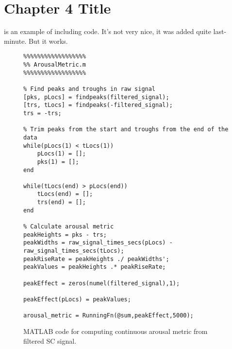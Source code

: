 
\chapter{Chapter 4 Title}

 is an example of including code. It's not very nice, it was added quite last-minute. But it works.

\begin{figure}[h]
	\centering
	
\begin{minipage}{0.8\textwidth}\smaller\begin{verbatim}
%%%%%%%%%%%%%%%%%%
%% ArousalMetric.m
%%%%%%%%%%%%%%%%%%

% Find peaks and troughs in raw signal
[pks, pLocs] = findpeaks(filtered_signal);
[trs, tLocs] = findpeaks(-filtered_signal);
trs = -trs;

% Trim peaks from the start and troughs from the end of the data
while(pLocs(1) < tLocs(1))
    pLocs(1) = [];
    pks(1) = [];
end

while(tLocs(end) > pLocs(end))
    tLocs(end) = [];
    trs(end) = [];
end

% Calculate arousal metric
peakHeights = pks - trs;
peakWidths = raw_signal_times_secs(pLocs) - raw_signal_times_secs(tLocs);
peakRiseRate = peakHeights ./ peakWidths';
peakValues = peakHeights .* peakRiseRate;

peakEffect = zeros(numel(filtered_signal),1);

peakEffect(pLocs) = peakValues;

arousal_metric = RunningFn(@sum,peakEffect,5000);
\end{verbatim}
	\end{minipage}
	\caption{MATLAB code for computing continuous arousal metric from filtered SC signal.}
	\label{fig:matlabGsrMetric}
\end{figure}